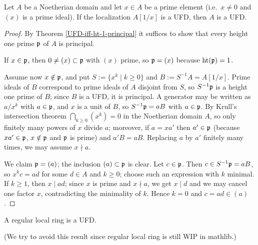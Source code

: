 \begin{lem}
\label{nagata-lemma}
\leanok
Let $A$ be a Noetherian domain and let $x\in A$ be a prime element
(i.e.~$x\neq 0$ and $(x)$ is a prime ideal).
If the localization $A[1/x]$ is a UFD, then $A$ is a UFD.
\end{lem}

\begin{proof}
\leanok
By Theorem \ref{UFD-iff-ht-1-principal} it suffices to show that every height one
prime ${\mathfrak{p}}$ of $A$ is principal.

If $x\in{\mathfrak{p}}$, then $0\neq(x)\subset{\mathfrak{p}}$ with $(x)$ prime, so ${\mathfrak{p}}=(x)$ because
${\mathrm{ht}}({\mathfrak{p}})=1$.

Assume now $x\notin{\mathfrak{p}}$, and put $S:=\{x^k\mid k\geq 0\}$ and $B:=S^{-1}A=A[1/x]$.
Prime ideals of $B$ correspond to prime ideals of $A$ disjoint from $S$, so
$S^{-1}{\mathfrak{p}}$ is a height one prime of $B$; since $B$ is a UFD, it is principal.
A generator may be written as $a/x^k$ with $a\in{\mathfrak{p}}$, and $x$ is a unit of $B$,
so $S^{-1}{\mathfrak{p}}=aB$ with $a\in{\mathfrak{p}}$.
By Krull's intersection theorem $\bigcap_{k\geq 0}(x^k)=0$ in the Noetherian
domain $A$, so only finitely many powers of $x$ divide $a$; moreover, if $a=xa'$
then $a'\in{\mathfrak{p}}$ (because $xa'\in{\mathfrak{p}}$, $x\notin{\mathfrak{p}}$ and ${\mathfrak{p}}$ is prime) and
$a'B=aB$. Replacing $a$ by $a'$ finitely many times, we may assume $x\nmid a$.

We claim ${\mathfrak{p}}=(a)$; the inclusion $(a)\subset{\mathfrak{p}}$ is clear.
Let $c\in{\mathfrak{p}}$. Then $c\in S^{-1}{\mathfrak{p}}=aB$, so $x^kc=ad$ for some $d\in A$ and
$k\geq 0$; choose such an expression with $k$ minimal.
If $k\geq 1$, then $x\mid ad$; since $x$ is prime and $x\nmid a$, we get $x\mid d$
and we may cancel one factor $x$, contradicting the minimality of $k$.
Hence $k=0$ and $c=ad\in(a)$.
\end{proof}

\begin{thm}
\label{regular-local-ring-is-UFD}
A regular local ring is a UFD.

(We try to avoid this result since regular local ring is still WIP in mathlib.)
\end{thm}

